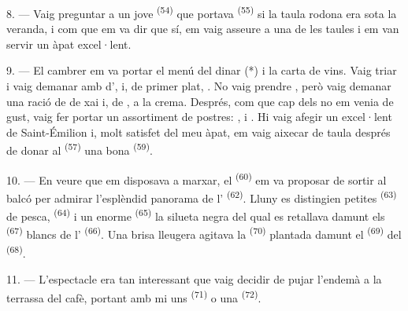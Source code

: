 8. --- Vaig preguntar a un jove  \textsuperscript{(54)} que portava
 \textsuperscript{(55)} si la taula rodona era sota la
veranda, i com que em va dir que sí, em vaig asseure a una de les taules i em van
servir un àpat excel·lent.


\VUsaut{4.0mm}
\VUsaut{3.0mm}

9. --- El cambrer em va portar el menú del dinar (*) i la carta de vins. Vaig
triar i vaig demanar  amb  d', i,
de primer plat, . No vaig prendre ,
però vaig demanar una ració de  de xai i, de ,
 a la crema. Després, com que cap dels  no
em venia de gust, vaig fer portar un assortiment de postres: ,
 i . Hi vaig afegir un excel·lent  de
Saint-Émilion i, molt satisfet del meu àpat, em vaig aixecar de taula després de
donar al  \textsuperscript{(57)} una bona 
\textsuperscript{(59)}.

10. --- En veure que em disposava a marxar, el 
\textsuperscript{(60)} em va proposar de sortir al balcó per admirar l'esplèndid
panorama de l' \textsuperscript{(62)}. Lluny es distingien petites
 \textsuperscript{(63)} de pesca, 
\textsuperscript{(64)} i un enorme  \textsuperscript{(65)} la
silueta negra del qual es retallava damunt els 
\textsuperscript{(67)} blancs de l' \textsuperscript{(66)}. Una
brisa lleugera agitava la  \textsuperscript{(70)} plantada damunt
el  \textsuperscript{(69)} del 
\textsuperscript{(68)}.

\VUsaut{3.0mm}
\VUsaut{3.0mm}

11. --- L'espectacle era tan interessant que vaig decidir de pujar l'endemà a la
terrassa del cafè, portant amb mi uns  \textsuperscript{(71)} o
una  \textsuperscript{(72)}.

